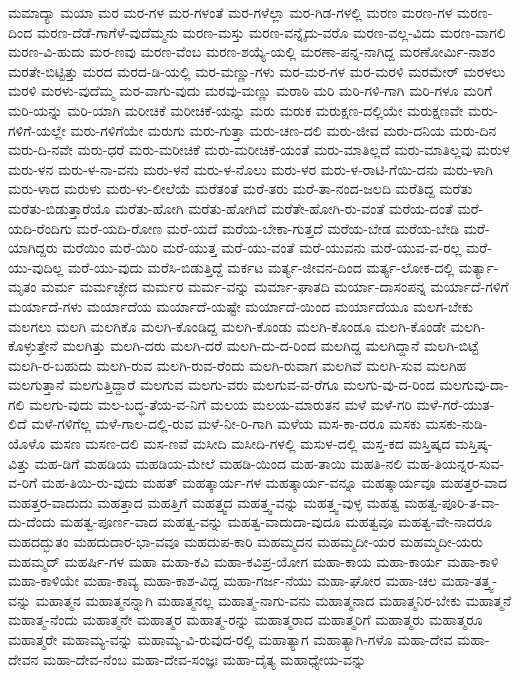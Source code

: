 {ಮಮಾದ್ಯಾ
ಮಯಾ
ಮರ
ಮರ-ಗಳ
ಮರ-ಗಳಂತೆ
ಮರ-ಗಳೆಲ್ಲಾ
ಮರ-ಗಿಡ-ಗಳಲ್ಲಿ
ಮರಣ
ಮರಣ-ಗಳ
ಮರಣ-ದಿಂದ
ಮರಣ-ದೆಡೆ-ಗಾಗೆಳೆ-ವುದೆಮ್ಮನು
ಮರಣ-ಮಸ್ತು
ಮರಣ-ವನ್ನೈದು-ವರೊ
ಮರಣ-ವಲ್ಲ-ವಿದು
ಮರಣ-ವಾಗಲಿ
ಮರಣ-ವಿ-ಹುದು
ಮರ-ಣವು
ಮರಣ-ವೆಂಬ
ಮರಣ-ಶಯ್ಯೆ-ಯಲ್ಲಿ
ಮರಣಾ-ಪನ್ನ-ನಾಗಿದ್ದ
ಮರಣೋರ್ಮಿ-ನಾಶಂ
ಮರತೇ-ಬಿಟ್ಟಿತ್ತು
ಮರದ
ಮರದ-ಡಿ-ಯಲ್ಲಿ
ಮರ-ಮಣ್ಣು-ಗಳು
ಮರ-ಮರ-ಗಳ
ಮರ-ಮರಳಿ
ಮರಮೇರ್
ಮರಳಲು
ಮರಳಿ
ಮರಳು-ವುದೆಮ್ಮ
ಮರ-ವಾಗು-ವುದು
ಮರವು-ಮಣ್ಣು
ಮರಾಠಿ
ಮರಿ
ಮರಿ-ಗಳಿ-ಗಾಗಿ
ಮರಿ-ಗಳೂ
ಮರಿಗೆ
ಮರಿ-ಯನ್ನು
ಮರಿ-ಯಾಗಿ
ಮರೀಚಿಕೆ
ಮರೀಚಿಕೆ-ಯನ್ನು
ಮರು
ಮರುಕ
ಮರುಕ್ಷಣ-ದಲ್ಲಿಯೇ
ಮರುಕ್ಷಣವೇ
ಮರು-ಗಳಿಗೆ-ಯಲ್ಲೇ
ಮರು-ಗಳಿಗೆಯೇ
ಮರುಗು
ಮರು-ಗುತ್ತಾ
ಮರು-ಚಣ-ದಲಿ
ಮರು-ಜೀವ
ಮರು-ದನಿಯ
ಮರು-ದಿನ
ಮರು-ದಿ-ನವೇ
ಮರು-ಧರೆ
ಮರು-ಮರೀಚಿಕೆ
ಮರು-ಮರೀಚಿಕೆ-ಯಂತೆ
ಮರು-ಮಾತಿಲ್ಲದೆ
ಮರು-ಮಾತಿಲ್ಲವು
ಮರುಳ
ಮರು-ಳನ
ಮರು-ಳ-ನಾ-ವನು
ಮರು-ಳನೆ
ಮರು-ಳ-ನೊಲು
ಮರು-ಳರ
ಮರು-ಳ-ರಾಟಿ-ಗೆಯಿ-ದನು
ಮರು-ಳಾಗಿ
ಮರು-ಳಾದ
ಮರುಳು
ಮರು-ಳು-ಲೀಲೆಯೆ
ಮರೆತಂತೆ
ಮರೆ-ತರು
ಮರೆ-ತಾ-ನಂದ-ಜಲದಿ
ಮರೆತಿದ್ದ
ಮರೆತು
ಮರೆತು-ಬಿಡುತ್ತಾರೆಯೊ
ಮರೆತು-ಹೋಗಿ
ಮರೆತು-ಹೋಗಿದೆ
ಮರೆತೇ-ಹೋಗಿ-ರು-ವಂತೆ
ಮರೆಯ-ದಂತೆ
ಮರೆ-ಯದಿ-ರೆಂದಿಗು
ಮರೆ-ಯದಿ-ರೋಣ
ಮರೆ-ಯದೆ
ಮರೆಯ-ಬೇಕಾ-ಗುತ್ತದೆ
ಮರೆಯ-ಬೇಡ
ಮರೆಯ-ಬೇಡಿ
ಮರೆ-ಯಾಗಿದ್ದರು
ಮರೆಯಿಂ
ಮರೆ-ಯಿರಿ
ಮರೆ-ಯುತ್ತ
ಮರೆ-ಯು-ವಂತೆ
ಮರೆ-ಯುವನು
ಮರೆ-ಯುವ-ವ-ರಲ್ಲ
ಮರೆ-ಯು-ವುದಿಲ್ಲ
ಮರೆ-ಯು-ವುದು
ಮರೆಸಿ-ಬಿಡುತ್ತಿದ್ದೆ
ಮರ್ಕಟ
ಮರ್ತ್ಯ-ಜೀವನ-ದಿಂದ
ಮರ್ತ್ಯ-ಲೋಕ-ದಲ್ಲಿ
ಮರ್ತ್ಯಾ-ಮೃತಂ
ಮರ್ಮ
ಮರ್ಮಚ್ಛೇದ
ಮರ್ಮರ
ಮರ್ಮ-ವನ್ನು
ಮರ್ಮಾ-ಘಾತದಿ
ಮರ್ಯಾ-ದಾಸಂಪನ್ನ
ಮರ್ಯಾದೆ-ಗಳಿಗೆ
ಮರ್ಯಾದೆ-ಗಳು
ಮರ್ಯಾದೆಯ
ಮರ್ಯಾದೆ-ಯಷ್ಟೇ
ಮರ್ಯಾದೆ-ಯಿಂದ
ಮರ್ಯಾದೆಯೂ
ಮಲಗ-ಬೇಕು
ಮಲಗಲು
ಮಲಗಿ
ಮಲಗಿಕೊ
ಮಲಗಿ-ಕೊಂಡಿದ್ದ
ಮಲಗಿ-ಕೊಂಡು
ಮಲಗಿ-ಕೊಂಡೂ
ಮಲಗಿ-ಕೊಂಡೇ
ಮಲಗಿ-ಕೊಳ್ಳುತ್ತೇನೆ
ಮಲಗಿತ್ತು
ಮಲಗಿ-ದರು
ಮಲಗಿ-ದರೆ
ಮಲಗಿ-ದು-ದ-ರಿಂದ
ಮಲಗಿದ್ದ
ಮಲಗಿದ್ದಾನೆ
ಮಲಗಿ-ಬಿಟ್ಟೆ
ಮಲಗಿ-ರ-ಬಹುದು
ಮಲಗಿ-ರುವ
ಮಲಗಿ-ರುವ-ರೆಂದು
ಮಲಗಿ-ರುವಾಗ
ಮಲಗಿವೆ
ಮಲಗಿ-ಸುವ
ಮಲಗಿಹ
ಮಲಗುತ್ತಾನೆ
ಮಲಗುತ್ತಿದ್ದಾರೆ
ಮಲಗುವ
ಮಲಗು-ವರು
ಮಲಗುವ-ವ-ರೆಗೂ
ಮಲಗು-ವು-ದ-ರಿಂದ
ಮಲಗುವು-ದಾ-ಗಲಿ
ಮಲಗು-ವುದು
ಮಲ-ಬದ್ಧ-ತೆಯ-ವ-ನಿಗೆ
ಮಲಯ
ಮಲಯ-ಮಾರುತನ
ಮಳೆ
ಮಳೆ-ಗರಿ
ಮಳೆ-ಗರೆ-ಯುತ-ಲಿದೆ
ಮಳೆ-ಗಳಿಗೆಲ್ಲ
ಮಳೆ-ಗಾಲ-ದಲ್ಲಿ-ರುವ
ಮಳೆ-ನೀ-ರಿ-ಗಾಗಿ
ಮಳೆಯ
ಮಸ-ಕಾ-ದರೂ
ಮಸಕು
ಮಸಕು-ನುಡಿ-ಯೊಳೊ
ಮಸಣ
ಮಸಣ-ದಲಿ
ಮಸ-ಣವೆ
ಮಸೀದಿ
ಮಸೀದಿ-ಗಳಲ್ಲಿ
ಮಸುಳ-ದಲ್ಲಿ
ಮಸ್ತ-ಕದ
ಮಸ್ತಿಷ್ಕದ
ಮಸ್ತಿಷ್ಕ-ವಿತ್ತು
ಮಹ-ಡಿಗೆ
ಮಹಡಿಯ
ಮಹಡಿಯ-ಮೇಲೆ
ಮಹಡಿ-ಯಿಂದ
ಮಹ-ತಾಯಿ
ಮಹತಿ-ನಲಿ
ಮಹ-ತಿಯನ್ನರ-ಸುವ-ವ-ರಿಗೆ
ಮಹ-ತಿಯಿ-ರು-ವುದು
ಮಹತ್
ಮಹತ್ಕಾರ್ಯ-ಗಳ
ಮಹತ್ಕಾರ್ಯ-ವನ್ನೂ
ಮಹತ್ಕಾರ್ಯವೂ
ಮಹತ್ತರ-ವಾದ
ಮಹತ್ತರ-ವಾದುದು
ಮಹತ್ತಾದ
ಮಹತ್ತಿಗೆ
ಮಹತ್ತ್ವದ
ಮಹತ್ತ್ವ-ವನ್ನು
ಮಹತ್ತ್ವ-ವುಳ್ಳ
ಮಹತ್ವ
ಮಹತ್ವ-ಪೂರಿ-ತ-ವಾ-ದು-ದೆಂದು
ಮಹತ್ವ-ಪೂರ್ಣ-ವಾದ
ಮಹತ್ವ-ವನ್ನು
ಮಹತ್ವ-ವಾದುದಾ-ವುದೂ
ಮಹತ್ವವೂ
ಮಹತ್ವ-ವೇ-ನಾದರೂ
ಮಹದದ್ಭುತಂ
ಮಹದುದಾರ-ಭಾ-ವವೂ
ಮಹದುಪ-ಕಾರಿ
ಮಹಮ್ಮದನ
ಮಹಮ್ಮದೀ-ಯರ
ಮಹಮ್ಮದೀ-ಯರು
ಮಹಮ್ಮದ್
ಮಹರ್ಷಿ-ಗಳ
ಮಹಾ
ಮಹಾ-ಕವಿ
ಮಹಾ-ಕವಿಪ್ರ-ಯೋಗ
ಮಹಾ-ಕಾಯ
ಮಹಾ-ಕಾರ್ಯ
ಮಹಾ-ಕಾಳಿ
ಮಹಾ-ಕಾಳಿಯೇ
ಮಹಾ-ಕಾವ್ಯ
ಮಹಾ-ಕಾಶ-ವಿದ್ದ
ಮಹಾ-ಗರ್ಜ-ನೆಯು
ಮಹಾ-ಘೋರ
ಮಹಾ-ಚಲ
ಮಹಾ-ತತ್ತ್ವ-ವನ್ನು
ಮಹಾತ್ಮನ
ಮಹಾತ್ಮನನ್ನಾಗಿ
ಮಹಾತ್ಮನಲ್ಲ
ಮಹಾತ್ಮ-ನಾಗು-ವನು
ಮಹಾತ್ಮನಾದ
ಮಹಾತ್ಮನಿರ-ಬೇಕು
ಮಹಾತ್ಮನೆ
ಮಹಾತ್ಮ-ನೆಂದು
ಮಹಾತ್ಮನೇ
ಮಹಾತ್ಮರ
ಮಹಾತ್ಮ-ರನ್ನು
ಮಹಾತ್ಮರಾದ
ಮಹಾತ್ಮರಿಗೆ
ಮಹಾತ್ಮರು
ಮಹಾತ್ಮರೂ
ಮಹಾತ್ಮರೇ
ಮಹಾಮ್ಯ-ವನ್ನು
ಮಹಾಮ್ಯ-ವಿ-ರುವುದ-ರಲ್ಲಿ
ಮಹಾತ್ಯಾಗ
ಮಹಾತ್ಯಾಗಿ-ಗಳೊ
ಮಹಾ-ದೇವ
ಮಹಾ-ದೇವನ
ಮಹಾ-ದೇವ-ನೆಂಬ
ಮಹಾ-ದೇವ-ಸಂಜ್ಞಃ
ಮಹಾ-ದೈತ್ಯ
ಮಹಾಧ್ಯೇಯ-ವನ್ನು
}
